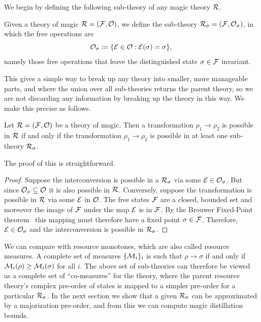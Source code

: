 \documentclass[pra,
aps,
twocolumn,
superscriptaddress,
groupedaddress,
nofootinbib,
reprint
]{revtex4-1}
\begin{document}
 We begin by defining the following sub-theory of any magic theory ${\mathcal R}$.
\begin{definition}\label{def:sigmafrag}
   Given a theory of magic ${\mathcal R} = ({\mathcal F}, {\mathcal O})$, we define the sub-theory ${\mathcal R}_\sigma = ({\mathcal F}, {\mathcal O}_\sigma)$, in which the free operations are 
   \begin{equation}
        {\mathcal O}_\sigma \coloneqq \{ {\mathcal E} \in {\mathcal O}: {\mathcal E}(\sigma) = \sigma \},
    \end{equation}
namely those free operations that leave the distinguished state $\sigma \in {\mathcal F}$ invariant.
\end{definition}
This gives a simple way to break up any theory into smaller, more manageable parts, and where the union over all sub-theories returns the parent theory, so we are not discarding any information by breaking up the theory in this way. We make this precise as follows.
\begin{theorem}\label{thm:frag}
    Let ${\mathcal R} = ({\mathcal F}, {\mathcal O})$ be a theory of magic.
Then a transformation $\rho_1 \rightarrow \rho_2$ is possible in ${\mathcal R}$ if and only if the transformation $\rho_1 \rightarrow \rho_2$ is possible in at least one sub-theory ${\mathcal R}_\sigma$.
\end{theorem}
The proof of this is straightforward.
\begin{proof}
   Suppose the interconversion is possible in a ${\mathcal R}_\sigma$ via some ${\mathcal E} \in {\mathcal O}_\sigma$. But since ${\mathcal O}_\sigma \subseteq {\mathcal O}$ it is also possible in ${\mathcal R}$. Conversely, suppose the transformation is possible in ${\mathcal R}$ via some ${\mathcal E}$ in ${\mathcal O}$. The free states ${\mathcal F}$ are a closed, bounded set and moreover the image of ${\mathcal F}$ under the map ${\mathcal E}$ is in ${\mathcal F}$. By the Brouwer Fixed-Point theorem~\cite{cit:brouwer} this mapping must therefore have a fixed point $\sigma \in {\mathcal F}$. Therefore, ${\mathcal E} \in {\mathcal O}_\sigma$ and the interconversion is possible in ${\mathcal R}_\sigma$.
\end{proof}
We can compare with resource monotones, which are also called resource measures. A complete set of measures $\{{\mathcal M}_i\}_i$ is such that $\rho \rightarrow \sigma$ if and only if ${\mathcal M}_i(\rho) \ge {\mathcal M}_i(\sigma)$ for all $i$. The above set of sub-theories can therefore be viewed as a complete set of ``co-measures'' for the theory, where the parent resource theory's complex pre-order of states is mapped to a simpler pre-order for a particular ${\mathcal R}_\sigma$. In the next section we show that a given ${\mathcal R}_\sigma$ can be approximated by a majorization pre-order, and from this we can compute magic distillation bounds.
\end{document}
